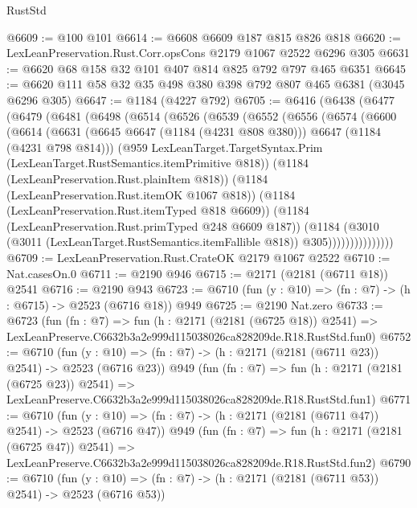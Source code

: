 \begin{lexlean}{RustStd}
\begin{coremodule}
@6609 := @100 @101
@6614 := @6608 @6609 @187 @815 @826 @818
@6620 := LexLeanPreservation.Rust.Corr.opsCons @2179 @1067 @2522 @6296 @305
@6631 := @6620 @68 @158 @32 @101 @407 @814 @825 @792 @797 @465 @6351
@6645 := @6620 @111 @58 @32 @35 @498 @380 @398 @792 @807 @465 @6381 (@3045 @6296 @305)
@6647 := @1184 (@4227 @792)
@6705 := @6416
    (@6438
      (@6477
        (@6479
          (@6481
            (@6498
              (@6514
                (@6526
                  (@6539
                    (@6552
                      (@6556
                        (@6574
                          (@6600
                            (@6614
                              (@6631
                                (@6645 @6647 (@1184 (@4231 @808 @380)))
                                @6647
                                (@1184 (@4231 @798 @814)))
                              (@959
                                LexLeanTarget.TargetSyntax.Prim
                                (LexLeanTarget.RustSemantics.itemPrimitive @818))
                              (@1184 (LexLeanPreservation.Rust.plainItem @818))
                              (@1184 (LexLeanPreservation.Rust.itemOK @1067 @818))
                              (@1184 (LexLeanPreservation.Rust.itemTyped @818 @6609))
                              (@1184 (LexLeanPreservation.Rust.primTyped @248 @6609 @187))
                              (@1184
                                (@3010
                                  (@3011 (LexLeanTarget.RustSemantics.itemFallible @818))
                                  @305)))))))))))))))
@6709 := LexLeanPreservation.Rust.CrateOK @2179 @1067 @2522
@6710 := Nat.casesOn.{0}
@6711 := @2190 @946
@6715 := @2171 (@2181 (@6711 @18)) @2541
@6716 := @2190 @943
@6723 := @6710 (fun (y : @10) => (fn : @7) -> (h : @6715) -> @2523 (@6716 @18)) @949
@6725 := @2190 Nat.zero
@6733 := @6723
    (fun (fn : @7) =>
    fun (h : @2171 (@2181 (@6725 @18)) @2541) =>
    LexLeanPreserve.C6632b3a2e999d115038026ca828209de.R18.RustStd.fun0)
@6752 := @6710
    (fun (y : @10) => (fn : @7) -> (h : @2171 (@2181 (@6711 @23)) @2541) -> @2523 (@6716 @23))
    @949
    (fun (fn : @7) =>
    fun (h : @2171 (@2181 (@6725 @23)) @2541) =>
    LexLeanPreserve.C6632b3a2e999d115038026ca828209de.R18.RustStd.fun1)
@6771 := @6710
    (fun (y : @10) => (fn : @7) -> (h : @2171 (@2181 (@6711 @47)) @2541) -> @2523 (@6716 @47))
    @949
    (fun (fn : @7) =>
    fun (h : @2171 (@2181 (@6725 @47)) @2541) =>
    LexLeanPreserve.C6632b3a2e999d115038026ca828209de.R18.RustStd.fun2)
@6790 := @6710
    (fun (y : @10) => (fn : @7) -> (h : @2171 (@2181 (@6711 @53)) @2541) -> @2523 (@6716 @53))

\end{coremodule}
\end{lexlean}
